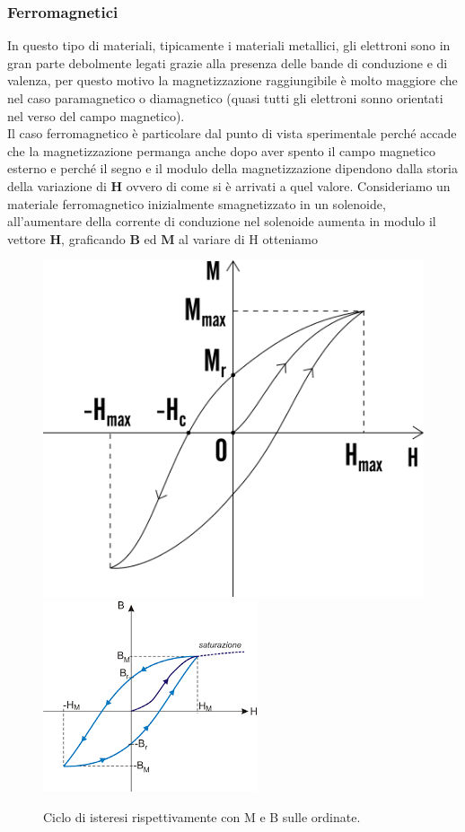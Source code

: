 \documentclass[
10pt, %
a4paper, %
oneside, %
headinclude,footinclude, %
BCOR5mm, %
]{scrartcl}
\begin{document}
\subsubsection{Ferromagnetici}
In questo tipo di materiali, tipicamente i materiali metallici, gli elettroni sono in gran parte debolmente legati grazie alla presenza delle bande di conduzione e di valenza, per questo motivo la magnetizzazione raggiungibile è molto maggiore che nel caso paramagnetico o diamagnetico (quasi tutti gli elettroni sonno orientati nel verso del campo magnetico).\\  
Il caso ferromagnetico è particolare dal punto di vista sperimentale perché accade che la magnetizzazione permanga anche dopo aver spento il campo magnetico esterno e perché il segno e il modulo della magnetizzazione dipendono dalla storia della variazione di \(\mathbf{H}\) ovvero di come si è arrivati a quel valore. Consideriamo un materiale ferromagnetico inizialmente smagnetizzato in un solenoide, all'aumentare della corrente di conduzione nel solenoide aumenta in modulo il vettore \(\mathbf{H}\), graficando \(\mathbf{B}\) ed \(\mathbf{M}\) al variare di H otteniamo 
\begin{figure}[h!]
	\centering
	\includegraphics[width=0.6\linewidth]{../images/isteresi_M}
	\quad
	\includegraphics[width=0.6\linewidth]{../images/isteresi_B}
	\caption{Ciclo di isteresi rispettivamente con M e B sulle ordinate.}
	\label{fig:isteresim}
\end{figure}
\end{document}
